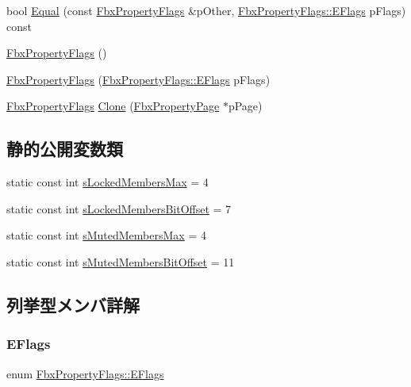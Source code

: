 \begin{DoxyCompactItemize}
\item 
bool \hyperlink{class_fbx_property_flags_a31bd65991f9d38027df4351e7c668a15}{Equal} (const \hyperlink{class_fbx_property_flags}{Fbx\+Property\+Flags} \&p\+Other, \hyperlink{class_fbx_property_flags_afabfa7e0949aac8a7dcdf8a141867e99}{Fbx\+Property\+Flags\+::\+E\+Flags} p\+Flags) const
\item 
\hyperlink{class_fbx_property_flags_a1dcc3803057520825d4632ba07b80974}{Fbx\+Property\+Flags} ()
\item 
\hyperlink{class_fbx_property_flags_a02b8c774de77a0cbd3482f11367c2f0c}{Fbx\+Property\+Flags} (\hyperlink{class_fbx_property_flags_afabfa7e0949aac8a7dcdf8a141867e99}{Fbx\+Property\+Flags\+::\+E\+Flags} p\+Flags)
\item 
\hyperlink{class_fbx_property_flags}{Fbx\+Property\+Flags} \hyperlink{class_fbx_property_flags_ac928577504324520a056da2f3cf7d340}{Clone} (\hyperlink{class_fbx_property_page}{Fbx\+Property\+Page} $\ast$p\+Page)
\end{DoxyCompactItemize}
\subsection*{静的公開変数類}
\begin{DoxyCompactItemize}
\item 
static const int \hyperlink{class_fbx_property_flags_ab5f1aacb767157209cd1b474b0db9c13}{s\+Locked\+Members\+Max} = 4
\item 
static const int \hyperlink{class_fbx_property_flags_a8c37f070e9e4a70a39fc721f69b6424d}{s\+Locked\+Members\+Bit\+Offset} = 7
\item 
static const int \hyperlink{class_fbx_property_flags_a044e37bb3031aa737cf6141d108c77cb}{s\+Muted\+Members\+Max} = 4
\item 
static const int \hyperlink{class_fbx_property_flags_a65028b3fb67cf0516952c23c659b8903}{s\+Muted\+Members\+Bit\+Offset} = 11
\end{DoxyCompactItemize}


\subsection{列挙型メンバ詳解}
\mbox{\label{class_fbx_property_flags_afabfa7e0949aac8a7dcdf8a141867e99}} 
\subsubsection{\texorpdfstring{E\+Flags}{EFlags}}
{\footnotesize\ttfamily enum \hyperlink{class_fbx_property_flags_afabfa7e0949aac8a7dcdf8a141867e99}{Fbx\+Property\+Flags\+::\+E\+Flags}}




